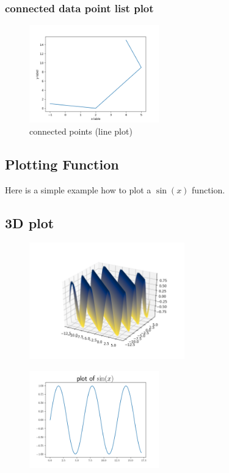 \documentclass[10pt,a4paper]{article}
\begin{document}
\subsubsection{connected data point list plot}

\begin{figure}[h]\centering \caption{connected points (line plot)}
\includegraphics[width=0.5\textwidth]{plot_list_data_4.png}
\end{figure}

\subsection{Plotting Function}
Here is a simple example how to plot a $\sin(x)$ function.

\subsection{3D plot}

\begin{figure}[h]\centering
\includegraphics[width=0.6\textwidth]{3dplot.png}
\end{figure}
\begin{figure}[h]\centering
\includegraphics[width=0.5\textwidth]{sin.png}
\end{figure}
\end{document}
